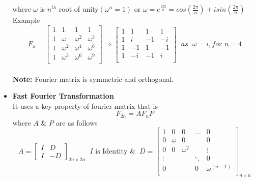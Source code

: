 \documentclass[a4paper,11pt]{article}
\numberwithin{equation}{section}
\begin{document}
\begin{itemize}
where $\omega$ is $n^{th}$ root of unity$(\omega^n=1)$ or $\omega=e^{\frac{2\pi i}{n}}=cos(\frac{2\pi}{n})+isin(\frac{2\pi}{n})$\\
Example\\
\[
F_4=\begin{bmatrix}
    1&1&1&1\\
    1&\omega&\omega^2&\omega^3\\
    1&\omega^2&\omega^4&\omega^6\\
    1&\omega^3&\omega^6&\omega^9\\
\end{bmatrix}\Longrightarrow
\begin{bmatrix}
    1&1&1&1\\
    1&i&-1&-i\\
    1&-1&1&-1\\
    1&-i&-1&i\\
\end{bmatrix} \hspace{7pt} as \hspace{7pt} \omega=i,for \hspace{4pt} n=4
\]
\\
\textbf{Note: }Fourier matrix is symmetric and orthogonal.\\
\item \textbf{Fast Fourier Transformation}\\
It uses a key property of fourier matrix that is
\[
F_{2n}=AF_nP
\]
where $A$ \& $P$ are as follows
\[
A=\begin{bmatrix}
    I&D\\I&-D
\end{bmatrix}_{2n\times 2n} \hspace{7pt} \text{$I$ is Identity \&} \hspace{7pt} D=\begin{bmatrix}
    1&0&0&\dots&0\\
    0&\omega&0&&0\\
    0&0&\omega^2&&\vdots\\
    \vdots&&&\ddots&0\\
    0&&&0&\omega^{(n-1)}\\
\end{bmatrix}_{n\times n}
\]


\end{itemize}
\end{document}
